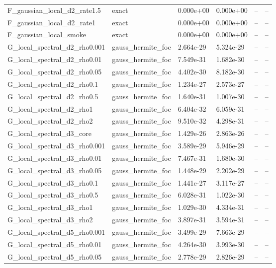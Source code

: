\begin{tabular}{llllll}
F\_gaussian\_local\_d2\_rate1.5 & exact & 0.000e+00 & 0.000e+00 & -- & -- \\
F\_gaussian\_local\_d2\_rate1 & exact & 0.000e+00 & 0.000e+00 & -- & -- \\
F\_gaussian\_local\_smoke & exact & 0.000e+00 & 0.000e+00 & -- & -- \\
G\_local\_spectral\_d2\_rho0.001 & gauss\_hermite\_foc & 2.664e-29 & 5.324e-29 & -- & -- \\
G\_local\_spectral\_d2\_rho0.01 & gauss\_hermite\_foc & 7.549e-31 & 1.682e-30 & -- & -- \\
G\_local\_spectral\_d2\_rho0.05 & gauss\_hermite\_foc & 4.402e-30 & 8.182e-30 & -- & -- \\
G\_local\_spectral\_d2\_rho0.1 & gauss\_hermite\_foc & 1.234e-27 & 2.573e-27 & -- & -- \\
G\_local\_spectral\_d2\_rho0.5 & gauss\_hermite\_foc & 1.640e-31 & 1.007e-30 & -- & -- \\
G\_local\_spectral\_d2\_rho1 & gauss\_hermite\_foc & 6.404e-32 & 6.059e-31 & -- & -- \\
G\_local\_spectral\_d2\_rho2 & gauss\_hermite\_foc & 9.510e-32 & 4.298e-31 & -- & -- \\
G\_local\_spectral\_d3\_core & gauss\_hermite\_foc & 1.429e-26 & 2.863e-26 & -- & -- \\
G\_local\_spectral\_d3\_rho0.001 & gauss\_hermite\_foc & 3.589e-29 & 5.946e-29 & -- & -- \\
G\_local\_spectral\_d3\_rho0.01 & gauss\_hermite\_foc & 7.467e-31 & 1.680e-30 & -- & -- \\
G\_local\_spectral\_d3\_rho0.05 & gauss\_hermite\_foc & 1.448e-29 & 2.202e-29 & -- & -- \\
G\_local\_spectral\_d3\_rho0.1 & gauss\_hermite\_foc & 1.441e-27 & 3.117e-27 & -- & -- \\
G\_local\_spectral\_d3\_rho0.5 & gauss\_hermite\_foc & 6.028e-31 & 1.022e-30 & -- & -- \\
G\_local\_spectral\_d3\_rho1 & gauss\_hermite\_foc & 1.029e-30 & 4.334e-31 & -- & -- \\
G\_local\_spectral\_d3\_rho2 & gauss\_hermite\_foc & 3.897e-31 & 3.594e-31 & -- & -- \\
G\_local\_spectral\_d5\_rho0.001 & gauss\_hermite\_foc & 3.499e-29 & 7.663e-29 & -- & -- \\
G\_local\_spectral\_d5\_rho0.01 & gauss\_hermite\_foc & 4.264e-30 & 3.993e-30 & -- & -- \\
G\_local\_spectral\_d5\_rho0.05 & gauss\_hermite\_foc & 2.778e-29 & 2.826e-29 & -- & -- \\

\end{tabular}
